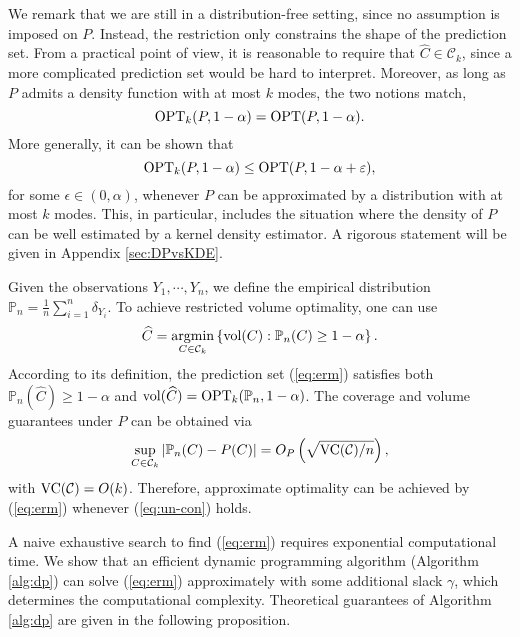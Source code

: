 \begin{remark}\label{rem:noloss:smooth}
We remark that we are still in a distribution-free setting, since no assumption is imposed on $P$. Instead, the restriction only constrains the shape of the prediction set. 
From a practical point of view, it is reasonable to require that
$\widehat{C}\in \mathcal{C}_k$,
since a more complicated prediction set would be hard to interpret. Moreover, as long as $P$ admits a density function with at most $k$ modes, the two notions match,
$$\operatorname{OPT}_k(P,1-\alpha)=\operatorname{OPT}(P,1-\alpha).$$
More generally, it can be shown that
$$\operatorname{OPT}_k(P,1-\alpha)\leq\operatorname{OPT}(P,1-\alpha+\varepsilon),$$
for some $\epsilon\in (0,\alpha)$, whenever $P$ can be approximated by a distribution with at most $k$ modes. This, in particular, includes the situation where the density of $P$ can be well estimated by a kernel density estimator. A rigorous statement will be given in Appendix \ref{sec:DPvsKDE}. 
\end{remark}

Given the observations $Y_1,\cdots,Y_n$, we define the empirical distribution $\mathbb{P}_n=\frac{1}{n}\sum_{i=1}^n\delta_{Y_i}$. To achieve restricted volume optimality, one can use
\begin{equation}
\widehat{C}=\operatorname*{argmin}_{C \in \mathcal{C}_k}\left\{\mathrm{vol}(C): \mathbb{P}_n(C)\geq 1-\alpha \right\}. \label{eq:erm}
\end{equation}
According to its definition, the prediction set (\ref{eq:erm}) satisfies both $\mathbb{P}_n(\widehat{C})\geq 1-\alpha$ and $\mathrm{vol}(\widehat{C})=\operatorname{OPT}_k(\mathbb{P}_n,1-\alpha)$. The coverage and volume guarantees under $P$ can be obtained via
\begin{equation}
\sup_{C \in \mathcal{C}_k}|\mathbb{P}_n(C)-P(C)| = O_P\left(\sqrt{{\rm VC}(\mathcal{C})/n}\right),\label{eq:un-con}
\end{equation}
with ${\rm VC}(\mathcal{C})=O(k)$. Therefore, approximate optimality can be achieved by (\ref{eq:erm}) whenever (\ref{eq:un-con}) holds.

A naive exhaustive search to find (\ref{eq:erm}) requires exponential computational time. We show that an efficient dynamic programming algorithm (Algorithm \ref{alg:dp}) can solve (\ref{eq:erm}) approximately with some additional slack $\gamma$, which determines the computational complexity. Theoretical guarantees of Algorithm \ref{alg:dp} are given in the following proposition.


